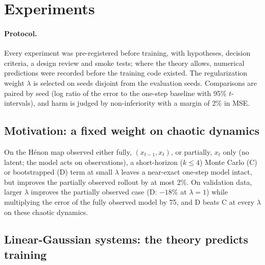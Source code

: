 \section{Experiments}
\label{sec:experiments}

\paragraph{Protocol.}
Every experiment was pre-registered before training, with hypotheses, decision criteria, a design review and smoke tests; where the theory allows, numerical predictions were recorded before the training code existed. The regularization weight $\lambda$ is selected on seeds disjoint from the evaluation seeds. Comparisons are paired by seed (log ratio of the error to the one-step baseline with 95\% $t$-intervals), and harm is judged by non-inferiority with a margin of 2\% in MSE.

\subsection{Motivation: a fixed weight on chaotic dynamics}
\label{sec:exp-henon}
On the Hénon map observed either fully, $(x_{t-1}, x_t)$, or partially, $x_t$ only (no latent; the model acts on observations), a short-horizon ($k \le 4$) Monte Carlo (C) or bootstrapped (D) term at small $\lambda$ leaves a near-exact one-step model intact, but improves the partially observed rollout by at most 2\%. On validation data, larger $\lambda$ improves the partially observed case (D: $-18\%$ at $\lambda = 1$) while multiplying the error of the fully observed model by 75, and D beats C at every $\lambda$ on these chaotic dynamics. 

\subsection{Linear-Gaussian systems: the theory predicts training}
\label{sec:exp-lgssm}

